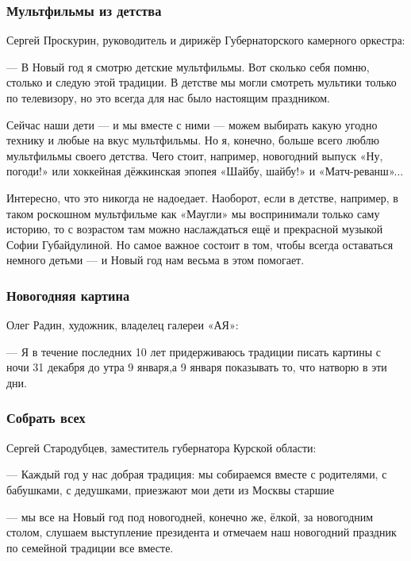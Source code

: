 \subsubsection{Мультфильмы из детства}

Сергей Проскурин, руководитель и дирижёр Губернаторского камерного оркестра:


\begin{zzquote}
— В Новый год я смотрю детские мультфильмы. Вот сколько себя помню, столько
и следую этой традиции. В детстве мы могли смотреть мультики только по
телевизору, но это всегда для нас было настоящим праздником.

Сейчас наши дети — и мы вместе с ними — можем выбирать какую угодно технику
и любые на вкус мультфильмы. Но я, конечно, больше всего люблю мультфильмы
своего детства. Чего стоит, например, новогодний выпуск «Ну, погоди!» или
хоккейная дёжкинская эпопея «Шайбу, шайбу!» и «Матч-реванш»...

Интересно, что это никогда не надоедает. Наоборот, если в детстве,
например, в таком роскошном мультфильме как «Маугли» мы воспринимали только
саму историю, то с возрастом там можно наслаждаться ещё и прекрасной
музыкой Софии Губайдулиной. Но самое важное состоит в том, чтобы всегда
оставаться немного детьми — и Новый год нам весьма в этом помогает.
\end{zzquote}

\subsubsection{Новогодняя картина}

Олег Радин, художник, владелец галереи «АЯ»:

\begin{zzquote}
— Я в течение последних 10 лет придерживаюсь традиции писать картины с ночи 31
декабря до утра 9 января,а 9 января показывать то, что натворю в эти дни.	
\end{zzquote}


\subsubsection{Собрать всех}

Сергей Стародубцев, заместитель губернатора Курской области:

\begin{zzquote}
— Каждый год у нас добрая традиция: мы собираемся вместе с родителями, с
бабушками, с дедушками, приезжают мои дети из Москвы старшие 

— мы все на Новый год под новогодней, конечно же, ёлкой, за новогодним столом,
слушаем выступление президента и отмечаем наш новогодний праздник по семейной
традиции все вместе.	
\end{zzquote}

